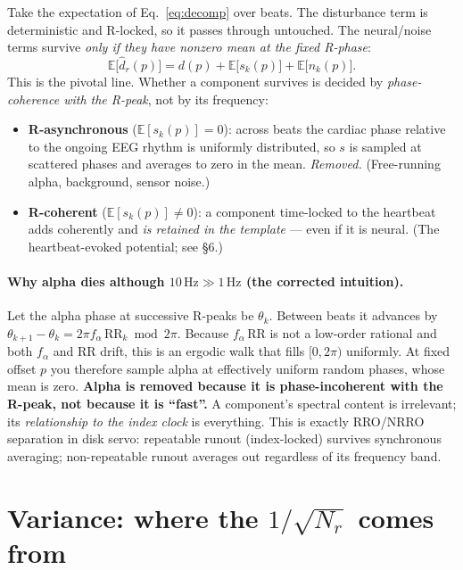 \documentclass[11pt]{article}
\newcommand{\E}{\mathbb{E}}
\newcommand{\dhat}{\widehat{d}}
\begin{document}
Take the expectation of Eq.~\eqref{eq:decomp} over beats. The disturbance term is deterministic
and R-locked, so it passes through untouched. The neural/noise terms survive \emph{only if they
have nonzero mean at the fixed R-phase}:
\begin{equation}
\E\bigl[\dhat_r(p)\bigr] = d(p) + \E\bigl[s_k(p)\bigr] + \E\bigl[n_k(p)\bigr].
\end{equation}
This is the pivotal line. Whether a component survives is decided by \emph{phase-coherence with
the R-peak}, not by its frequency:
\begin{itemize}[leftmargin=1.4em,itemsep=3pt]
\item \textbf{R-asynchronous} ($\E[s_k(p)]=0$): across beats the cardiac phase relative to the
ongoing EEG rhythm is uniformly distributed, so $s$ is sampled at scattered phases and averages
to zero in the mean. \emph{Removed.} (Free-running alpha, background, sensor noise.)
\item \textbf{R-coherent} ($\E[s_k(p)]\neq 0$): a component time-locked to the heartbeat adds
coherently and \emph{is retained in the template} --- even if it is neural. (The
heartbeat-evoked potential; see \S6.)
\end{itemize}

\paragraph{Why alpha dies although $10\,\text{Hz}\gg1\,\text{Hz}$ (the corrected intuition).}
Let the alpha phase at successive R-peaks be $\theta_k$. Between beats it advances by
$\theta_{k+1}-\theta_k = 2\pi f_\alpha\,\mathrm{RR}_k \bmod 2\pi$. Because $f_\alpha\,\mathrm{RR}$
is not a low-order rational and both $f_\alpha$ and $\mathrm{RR}$ drift, this is an ergodic walk
that fills $[0,2\pi)$ uniformly. At fixed offset $p$ you therefore sample alpha at effectively
uniform random phases, whose mean is zero. \textbf{Alpha is removed because it is
phase-incoherent with the R-peak, not because it is ``fast''.} A component's spectral content is
irrelevant; its \emph{relationship to the index clock} is everything. This is exactly RRO/NRRO
separation in disk servo: repeatable runout (index-locked) survives synchronous averaging;
non-repeatable runout averages out regardless of its frequency band.

\section{Variance: where the $1/\sqrt{N_r}$ comes from}
\end{document}

